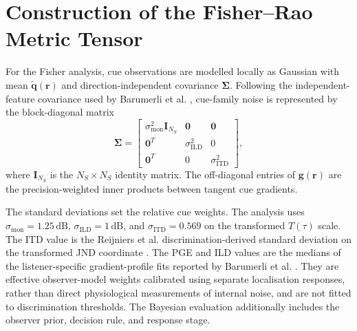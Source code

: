 \documentclass[journal]{IEEEtran}
\begin{document}
\section{Construction of the Fisher--Rao Metric Tensor}
For the Fisher analysis, cue observations are modelled locally as Gaussian with mean \(\widetilde{\mathbf{q}}(\mathbf{r})\) and direction-independent covariance \(\boldsymbol{\Sigma}\). Following the independent-feature covariance used by Barumerli et al. \cite{Barumerli2023}, cue-family noise is represented by the block-diagonal matrix
\begin{equation}
\boldsymbol{\Sigma} = 
\begin{bmatrix}
\sigma_{\mathrm{mon}}^2 \mathbf{I}_{N_S} & \mathbf{0} & \mathbf{0} \\
\mathbf{0}^T & \sigma_{\mathrm{ILD}}^2 & 0 \\
\mathbf{0}^T & 0 & \sigma_{\mathrm{ITD}}^2
\end{bmatrix},
\end{equation}
where \(\mathbf{I}_{N_S}\) is the \(N_S\times N_S\) identity matrix. The off-diagonal entries of \(\mathbf{g}(\mathbf{r})\) are the precision-weighted inner products between tangent cue gradients.

The standard deviations set the relative cue weights. The analysis uses \(\sigma_{\mathrm{mon}}=1.25\,\mathrm{dB}\), \(\sigma_{\mathrm{ILD}}=1\,\mathrm{dB}\), and \(\sigma_{\mathrm{ITD}}=0.569\) on the transformed \(T(\tau)\) scale. The ITD value is the Reijniers et al. discrimination-derived standard deviation on the transformed JND coordinate \cite{Reijniers2014}. The PGE and ILD values are the medians of the listener-specific gradient-profile fits reported by Barumerli et al. \cite{Barumerli2023}. They are effective observer-model weights calibrated using separate localisation responses, rather than direct physiological measurements of internal noise, and are not fitted to discrimination thresholds. The Bayesian evaluation additionally includes the observer prior, decision rule, and response stage.
\end{document}
